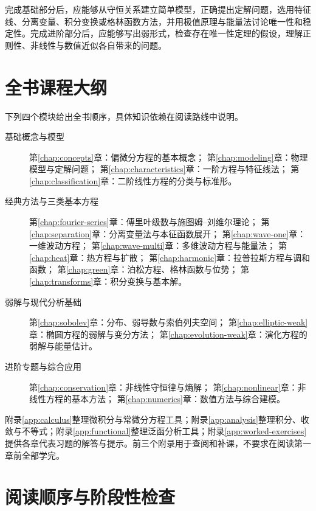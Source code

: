 \documentclass[UTF8,12pt,a4paper,fontset=fandol]{ctexbook}
\begin{document}
完成基础部分后，应能够从守恒关系建立简单模型，正确提出定解问题，选用特征线、分离变量、积分变换或格林函数方法，并用极值原理与能量法讨论唯一性和稳定性。完成进阶部分后，应能够写出弱形式，检查存在唯一性定理的假设，理解正则性、非线性与数值近似各自带来的问题。

\section{全书课程大纲}

下列四个模块给出全书顺序，具体知识依赖在阅读路线中说明。

\begin{description}
  \item[基础概念与模型]
  第\ref{chap:concepts}章：偏微分方程的基本概念；
  第\ref{chap:modeling}章：物理模型与定解问题；
  第\ref{chap:characteristics}章：一阶方程与特征线法；
  第\ref{chap:classification}章：二阶线性方程的分类与标准形。
  \item[经典方法与三类基本方程]
  第\ref{chap:fourier-series}章：傅里叶级数与施图姆--刘维尔理论；
  第\ref{chap:separation}章：分离变量法与本征函数展开；
  第\ref{chap:wave-one}章：一维波动方程；
  第\ref{chap:wave-multi}章：多维波动方程与能量法；
  第\ref{chap:heat}章：热方程与扩散；
  第\ref{chap:harmonic}章：拉普拉斯方程与调和函数；
  第\ref{chap:green}章：泊松方程、格林函数与位势；
  第\ref{chap:transforms}章：积分变换与基本解。
  \item[弱解与现代分析基础]
  第\ref{chap:sobolev}章：分布、弱导数与索伯列夫空间；
  第\ref{chap:elliptic-weak}章：椭圆方程的弱解与变分方法；
  第\ref{chap:evolution-weak}章：演化方程的弱解与能量估计。
  \item[进阶专题与综合应用]
  第\ref{chap:conservation}章：非线性守恒律与熵解；
  第\ref{chap:nonlinear}章：非线性方程的基本方法；
  第\ref{chap:numerics}章：数值方法与综合建模。
\end{description}

附录\ref{app:calculus}整理微积分与常微分方程工具；附录\ref{app:analysis}整理积分、收敛与不等式；附录\ref{app:functional}整理泛函分析工具；附录\ref{app:worked-exercises}提供各章代表习题的解答与提示。前三个附录用于查阅和补课，不要求在阅读第一章前全部学完。

\section{阅读顺序与阶段性检查}
\end{document}

